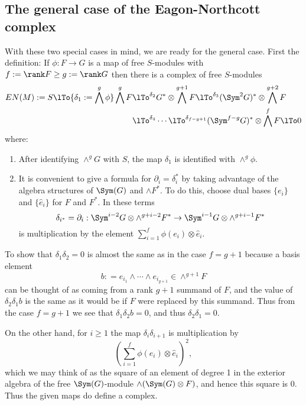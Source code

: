 \subsection{The general case of the Eagon-Northcott complex}
With these two special cases in mind, we are ready for the general case. First the definition:
If $\phi: F\to G$ is a map of free $S$-modules with $f:=\rank F\geq  g:= \rank G$ then there is
a complex of free $S$-modules
\begin{align*}
EN(M) := 
S \lTo{\delta_{1}:= \bigwedge^g \phi} 
 \bigwedge^g F&
 \lTo^{\delta_{2}}
 G^*\otimes \bigwedge^{g+1} F  \lTo^{\delta_{3}}
  (\Sym^2G)^*\otimes\bigwedge^{g+2}F  \\
 &\lTo^{\delta_{4}}\cdots\lTo^{\delta_{f-g+1}} 
(\Sym^{f-g}G)^*\otimes\bigwedge^fF 
 \lTo 0
\end{align*}
where:
\begin{enumerate}
 
\item After identifying $\wedge^{g}G$ with $S$, the map $\delta_{1}$ is identified with $\wedge^{g}\phi$.

\item It is convenient to give a formula for $\partial_{i} = \delta_{i}^{*}$ by taking advantage of the 
algebra structures of $\Sym(G)$ and $\wedge F^{*}$. To do this, choose dual bases $\{e_{i}\}$ and $\{\hat e_{i}\}$ for $F$ and $F^{*}$. In these terms
$$
\delta_{i^{*}} = \partial_{i}: 
\Sym^{i-2}G \otimes \wedge^{g+i-2}F^{*} \to 
\Sym^{i-1}G \otimes \wedge^{g+i-1}F^{*}
$$
 is multiplication by the element
$\sum_{i = 1}^{f} \phi(e_{i}) \otimes \hat e_{i}$.
\end{enumerate}

To show that $\delta_{1}\delta_{2} = 0$ is almost the same as in the case $f = g+1$ because
a basis element 
$$
b: = e_{i_{1}}\wedge \cdots \wedge e_{i_{g+1}} \in \wedge^{g+1}F
$$
can be thought of as coming from a rank $g+1$ summand of $F$, and the value of $\delta_{2}\delta_{1}b$
is the same as it would be if $F$ were replaced by this summand. Thus from the case $f=g+1$ we see
that $\delta_{1}\delta_{2}b = 0$, and thus $\delta_{2}\delta_{1} = 0$.

On the other hand, for $i\geq 1$ the map $\delta_{i}\delta_{i+1}$ is multiplication by
$$
\left(\sum_{i = 1}^{f} \phi(e_{i}) \otimes \hat e_{i}\right)^{2},
$$
which we may think of as the square of an element of degree 1 in the exterior algebra
of the free $\Sym(G)$-module $\wedge(\Sym(G)\otimes F)$, and hence this square is 0.
Thus the given maps do define a complex.


